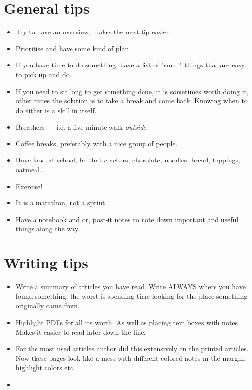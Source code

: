 \documentclass[../thesis.tex]{subfiles}
\begin{document}
\section{General tips}
\begin{itemize}
    \item Try to have an overview, makes the next tip easier. 
    \item Prioritise and have some kind of plan
    \item If you have time to do something, have a list of "small" things that are easy to pick up and do.
    \item If you need to sit long to get something done, it is sometimes worth doing it, other times the solution is to take a break and come back. Knowing when to do either is a skill in itself. 
    \item Breathers — i.e. a five-minute walk \emph{outside}
    \item Coffee breaks, preferably with a nice group of people.
    \item Have food at school, be that crackers, chocolate, noodles, bread, toppings, oatmeal...
    \item Exercise!
    \item It is a marathon, not a sprint.
    \item Have a notebook and or, post-it notes to note down important and useful things along the way.
\end{itemize}

\section{Writing tips}
\begin{itemize}
    \item Write a summary of articles you have read. Write ALWAYS where you have found something, the worst is spending time looking for the place something originally came from. 
    \item Highlight PDFs for all its worth. As well as placing text boxes with notes Makes it easier to read later down the line. 
    \item For the most used articles author did this extensively on the printed articles. Now these pages look like a mess with different colored notes in the margin, highlight colors etc.
    \item 
\end{itemize}
\end{document}
